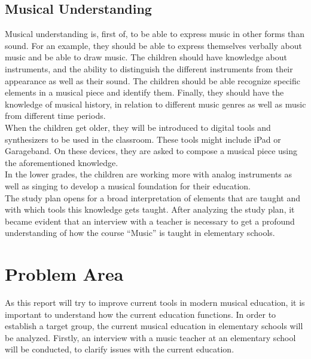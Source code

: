 \subsection*{Musical Understanding}
Musical understanding is, first of, to be able to express music in other forms than sound. For an example, they should be able to express themselves verbally about music and be able to draw music. The children should have knowledge about instruments, and the ability to distinguish the different instruments from their appearance as well as their sound. The children should be able recognize specific elements in a musical piece and identify them. Finally, they should have the knowledge of musical history, in relation to different music genres as well as music from different time periods.
\\

When the children get older, they will be introduced to digital tools and synthesizers to be used in the classroom. These tools might include iPad or Garageband. On these devices, they are asked to compose a musical piece using the aforementioned knowledge.\\
In the lower grades, the children are working more with analog instruments as well as singing to develop a musical foundation for their education.
\\

The study plan opens for a broad interpretation of elements that are taught and with which tools this knowledge gets taught. After analyzing the study plan, it became evident that an interview with a teacher is necessary to get a profound understanding of how the course “Music” is taught in elementary schools.\\

\section{Problem Area}
As this report will try to improve current tools in modern musical education, it is important to understand how the current education functions. In order to establish a target group, the current musical education in elementary schools will be analyzed. Firstly, an interview with a music teacher at an elementary school will be conducted, to clarify issues with the current education. \\	



